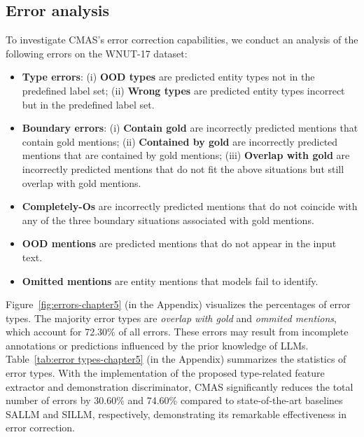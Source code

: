 \subsection{Error analysis}
\label{subsec:error analysis}
To investigate \ac{CMAS}'s error correction capabilities, we conduct an analysis of the following errors on the WNUT-17 dataset:

\begin{itemize}[leftmargin=*,nosep]
    \item \textbf{Type errors}: (i) \textbf{OOD types} are predicted entity types not in the predefined label set; (ii) \textbf{Wrong types} are predicted entity types incorrect but in the predefined label set.
    \item \textbf{Boundary errors}: 
    (i) \textbf{Contain gold} are incorrectly predicted mentions that contain gold mentions;
    (ii) \textbf{Contained by gold} are incorrectly predicted mentions that are contained by gold mentions;
    (iii) \textbf{Overlap with gold} are incorrectly predicted mentions that do not fit the above situations but still overlap with gold mentions.
    \item \textbf{Completely-Os} are incorrectly predicted mentions that do not coincide with any of the three boundary situations associated with gold mentions.
    \item \textbf{OOD mentions} are predicted mentions that do not appear in the input text.
    \item \textbf{Omitted mentions} are entity mentions that models fail to identify.
\end{itemize}

\noindent
Figure~\ref{fig:errors-chapter5} (in the Appendix) visualizes the percentages of error types. 
The majority error types are \emph{overlap with gold} and \emph{ommited mentions}, which account for 72.30\% of all errors. 
These errors may result from incomplete annotations or predictions influenced by the prior knowledge of \acp{LLM}.
Table~\ref{tab:error types-chapter5} (in the Appendix) summarizes the statistics of error types. With the implementation of the proposed type-related feature extractor and demonstration discriminator, CMAS significantly reduces the total number of errors by 30.60\% and 74.60\% compared to state-of-the-art baselines SALLM and SILLM, respectively, demonstrating its remarkable effectiveness in error correction.


